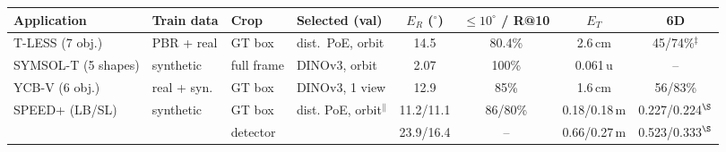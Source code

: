 \begin{tabular}{@{}l l l l cc c c@{}}
\toprule
Application & Train data & Crop & Selected (val) & $E_R$ ($^\circ$) & $\le10^\circ$ / R@10 & $E_T$ & 6D \\
\midrule
T-LESS (7 obj.) & PBR + real & GT box & dist.\ PoE, orbit & 14.5 & 80.4\% & 2.6\,cm & 45/74\%$^\ddagger$ \\
SYMSOL-T (5 shapes) & synthetic & full frame & DINOv3, orbit & 2.07 & 100\% & 0.061\,u & -- \\
YCB-V (6 obj.) & real + syn. & GT box & DINOv3, 1 view & 12.9 & 85\% & 1.6\,cm & 56/83\% \\
SPEED+ (LB/SL) & synthetic & GT box & dist. PoE, orbit$^\|$ & 11.2/11.1 & 86/80\% & 0.18/0.18\,m & 0.227/0.224$^\S$ \\
 &  & detector &  & 23.9/16.4 & -- & 0.66/0.27\,m & 0.523/0.333$^\S$ \\
\bottomrule
\end{tabular}